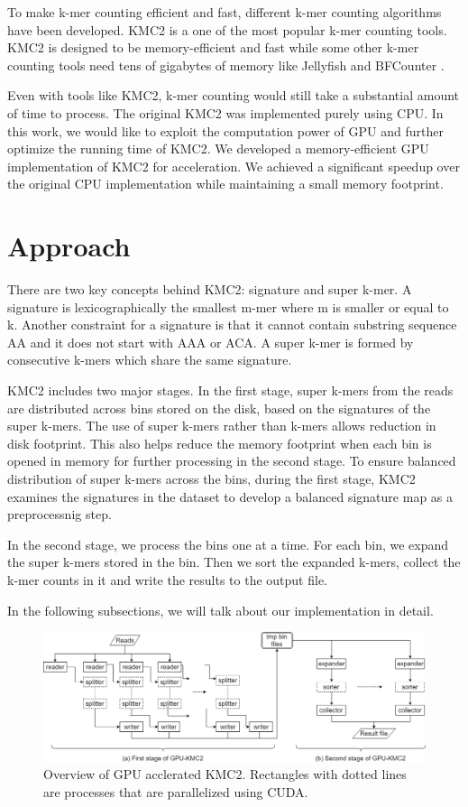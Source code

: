 \documentclass{bioinfo}
\begin{document}
To make k-mer counting efficient and fast, different k-mer counting algorithms have been developed.
KMC2 \citep{Seb14} is a one of the most popular k-mer counting tools. KMC2 is designed to
be memory-efficient and fast while some other k-mer counting tools need tens of
gigabytes of memory like Jellyfish \citep{Mar11} and BFCounter \citep{Mel11}.

Even with tools like KMC2, k-mer counting would still take a substantial amount of time to
process. The original KMC2 was implemented purely using CPU.
In this work, we would like to exploit the computation power of GPU and further optimize
the running time of KMC2. We developed a memory-efficient GPU implementation of KMC2 for
acceleration.
We achieved a significant speedup over the original CPU implementation while maintaining a
small memory footprint.

\section{Approach}
There are two key concepts behind KMC2: signature and super k-mer.
A signature is lexicographically the smallest m-mer where m is smaller or equal to k.
Another constraint for a signature is that it cannot contain substring sequence AA and it
does not start with AAA or ACA.
A super k-mer is formed by consecutive k-mers which share the same signature.

KMC2 includes two major stages. In the first stage, super k-mers from the reads are 
distributed across bins stored on the disk, based on the signatures of the super k-mers. 
The use of super k-mers rather than k-mers allows reduction in disk footprint. This also 
helps reduce the memory footprint when each bin is opened in memory for further processing 
in the second stage. To ensure balanced distribution of super k-mers across the bins, 
during the first stage, KMC2 examines the signatures in the dataset to develop a balanced 
signature map as a preprocessnig step.

In the second stage, we process the bins one at a time. For each bin, we expand the super
k-mers stored in the bin. Then we sort the expanded k-mers, collect the k-mer counts in it 
and write the results to the output file.

In the following subsections, we will talk about our implementation in detail.
\begin{figure}[t]
	\centering
	\includegraphics[scale=0.5]{kmc2.png}
	\caption{Overview of GPU acclerated KMC2. Rectangles with dotted lines are processes
	that are parallelized using CUDA.}\label{fig:01}
\end{figure}
\enlargethispage{6pt}
\end{document}
